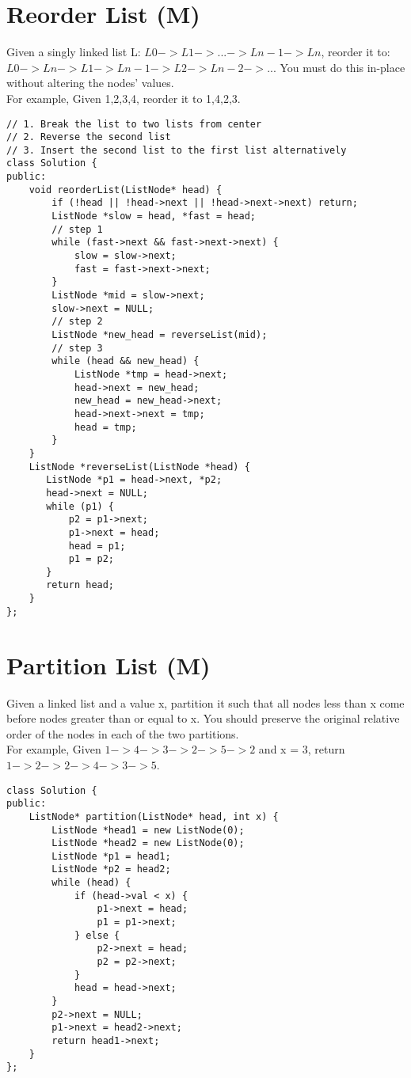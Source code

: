 \section{Reorder List (M)}
Given a singly linked list L: $L0 -> L1 -> ... -> Ln-1 -> Ln$, reorder it to: $L0 -> Ln -> L1 -> Ln-1 -> L2 -> Ln-2 -> ...$ You must do this in-place without altering the nodes' values.\\

For example,
Given {1,2,3,4}, reorder it to {1,4,2,3}. \\

\begin{lstlisting}
// 1. Break the list to two lists from center
// 2. Reverse the second list
// 3. Insert the second list to the first list alternatively
class Solution {
public:
    void reorderList(ListNode* head) {
        if (!head || !head->next || !head->next->next) return;
        ListNode *slow = head, *fast = head;
        // step 1
        while (fast->next && fast->next->next) {
            slow = slow->next;
            fast = fast->next->next;
        }
        ListNode *mid = slow->next;
        slow->next = NULL;
        // step 2
        ListNode *new_head = reverseList(mid);
        // step 3
        while (head && new_head) {
            ListNode *tmp = head->next;
            head->next = new_head;
            new_head = new_head->next;
            head->next->next = tmp;
            head = tmp;
        }
    }
    ListNode *reverseList(ListNode *head) {
       ListNode *p1 = head->next, *p2;
       head->next = NULL;
       while (p1) {
           p2 = p1->next;
           p1->next = head;
           head = p1;
           p1 = p2;
       }
       return head;
    }
};
\end{lstlisting}


\section{Partition List (M)}
Given a linked list and a value x, partition it such that all nodes less than x come before nodes greater than or equal to x. You should preserve the original relative order of the nodes in each of the two partitions.\\

For example,
Given $1->4->3->2->5->2$ and x = 3,
return $1->2->2->4->3->5$. \\

\begin{lstlisting}
class Solution {
public:
    ListNode* partition(ListNode* head, int x) {
        ListNode *head1 = new ListNode(0);
        ListNode *head2 = new ListNode(0);
        ListNode *p1 = head1;
        ListNode *p2 = head2;
        while (head) {
            if (head->val < x) {
                p1->next = head;
                p1 = p1->next;
            } else {
                p2->next = head;
                p2 = p2->next;
            }
            head = head->next;
        }
        p2->next = NULL;
        p1->next = head2->next;
        return head1->next;
    }
};
\end{lstlisting}



